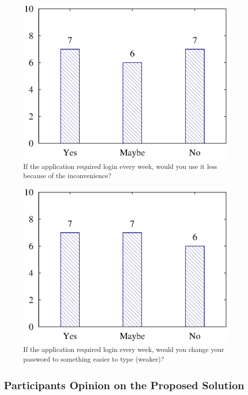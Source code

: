 \begin{figure}[H]
\centering
\includegraphics[scale=.7]{files/question5/question5.eps}
\caption{If the application required login every week, would you use it less because of the inconvenience?}
\label{fig:digraph}
\end{figure}

\begin{figure}[H]
\centering
\includegraphics[scale=.7]{files/question6/question6.eps}
\caption{If the application required login every week, would you change your password to something easier to type (weaker)?}
\label{fig:digraph}
\end{figure}

\subsection{Participants Opinion on the Proposed Solution}

